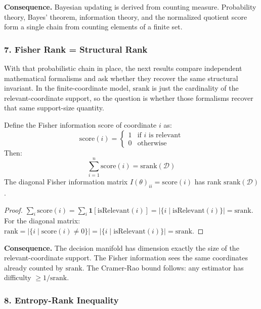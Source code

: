 \noindent\textbf{Consequence.} Bayesian updating is derived from counting measure. Probability theory, Bayes' theorem, information theory, and the normalized quotient score form a single chain from counting elements of a finite set.

\subsubsection{7. Fisher Rank = Structural Rank}

With that probabilistic chain in place, the next results compare independent mathematical formalisms and ask whether they recover the same structural invariant. In the finite-coordinate model, $\mathrm{srank}$ is just the cardinality of the relevant-coordinate support, so the question is whether those formalisms recover that same support-size quantity.

\begin{theorem}[Fisher Information = Structural Rank]\label{thm:fisher-rank-srank}
Define the Fisher information score of coordinate $i$ as:
\[
  \mathrm{score}(i) = \begin{cases} 1 & \text{if } i \text{ is relevant} \\ 0 & \text{otherwise} \end{cases}
\]
Then:
\[
  \sum_{i=1}^{n} \mathrm{score}(i) = \mathrm{srank}(\mathcal{D})
\]
The diagonal Fisher information matrix $I(\theta)_{ii} = \mathrm{score}(i)$ has rank $\mathrm{srank}(\mathcal{D})$.
\end{theorem}

\begin{proof}
$\sum_i \mathrm{score}(i) = \sum_i \mathbf{1}[\text{isRelevant}(i)] = |\{i \mid \text{isRelevant}(i)\}| = \mathrm{srank}$.
For the diagonal matrix: $\mathrm{rank} = |\{i \mid \mathrm{score}(i) \neq 0\}| = |\{i \mid \text{isRelevant}(i)\}| = \mathrm{srank}$.
\end{proof}

\noindent\textbf{Consequence.} The decision manifold has dimension exactly the size of the relevant-coordinate support. The Fisher information sees the same coordinates already counted by $\mathrm{srank}$. The Cramer-Rao bound follows: any estimator has difficulty $\geq 1/\mathrm{srank}$.

\subsubsection{8. Entropy-Rank Inequality}


